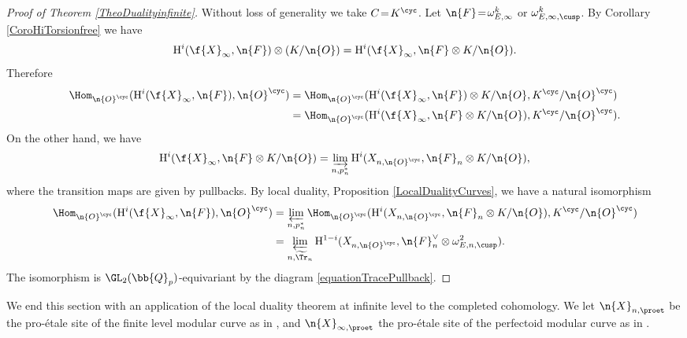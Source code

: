 \begin{proof}[Proof of Theorem \ref{TheoDualityinfinite}]

Without loss of generality we take $C\!=\!K^{\cyc}$. Let $\n{F}\!=\!\omega_{E,\infty}^k$ or $\omega^{k}_{E,\infty, \cusp}$. By Corollary \ref{CoroHiTorsionfree} we have
\[
\mathrm{H}^i(\f{X}_{\infty}, \n{F})\otimes (K/ \n{O}) = \mathrm{H}^i(\f{X}_{\infty}, \n{F} \otimes K/ \n{O}).
\]
Therefore
\begin{align*}
\Hom_{\n{O}^{\cyc}}(\mathrm{H}^i(\f{X}_{\infty}, \n{F}), \n{O}^{\cyc}) & = \Hom_{\n{O}^{\cyc}}(\mathrm{H}^i(\f{X}_{\infty}, \n{F})\otimes K/ \n{O} , K^{\cyc}/\n{O}^{\cyc}) \\
							 & = \Hom_{\n{O}^{\cyc}}(\mathrm{H}^i(\f{X}_{\infty}, \n{F}\otimes K/ \n{O}) , K^{\cyc}/\n{O}^{\cyc}).
\end{align*}
On the other hand, we have
\[
\mathrm{H}^i(\f{X}_{\infty}, \n{F}\otimes K/ \n{O}) = \varinjlim_{n,p_n^*} \mathrm{H}^i(X_{n,\n{O}^{\cyc}}, \n{F}_n\otimes K/ \n{O}),
\]
where the transition maps are given by pullbacks. By local duality, Proposition \ref{LocalDualityCurves}, we have a natural isomorphism
\begin{align*}
\Hom_{\n{O}^{\cyc}}(\mathrm{H}^i(\f{X}_{\infty}, \n{F}), \n{O}^{\cyc}) & = \varprojlim_{n, p_n^*} \Hom_{\n{O}^{\cyc}}(\mathrm{H}^i(X_{n,\n{O}^{\cyc}}, \n{F}_n \otimes K/ \n{O}), K^{\cyc}/ \n{O}^{\cyc}) \\
					& = \varprojlim_{n, \widetilde{\Tr}_n} \mathrm{H}^{1-i}(X_{n,\n{O}^{\cyc}}, \n{F}_n^{\vee}\otimes \omega^2_{E,n,\cusp}).
\end{align*}
The isomorphism is $\GL_2(\bb{Q}_p)$-equivariant by the diagram \eqref{equationTracePullback}.
\end{proof}

We end this section with an application of the local duality theorem at infinite level to the completed cohomology. We let $\n{X}_{n,\proet}$ be the pro-étale site of the finite level modular curve as in \cite[\S 3]{MR3090230}, and $\n{X}_{\infty, \proet}$ the pro-étale site of the perfectoid modular curve as in \cite[Lect.\,8]{ScholzeWeinspadicgeometry}.

